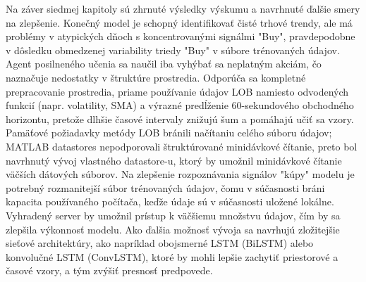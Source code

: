 \documentclass[a4paper,oneside,onecolumn,12pt]{book}
\begin{document}
Na záver siedmej kapitoly sú zhrnuté výsledky výskumu a navrhnuté ďalšie smery na zlepšenie. Konečný model je schopný identifikovať čisté trhové trendy, ale má problémy v atypických dňoch s koncentrovanými signálmi "Buy", pravdepodobne v dôsledku obmedzenej variability triedy "Buy" v súbore trénovaných údajov. Agent posilneného učenia sa naučil iba vyhýbať sa neplatným akciám, čo naznačuje nedostatky v štruktúre prostredia. Odporúča sa kompletné prepracovanie prostredia, priame používanie údajov LOB namiesto odvodených funkcií (napr. volatility, SMA) a výrazné predĺženie 60-sekundového obchodného horizontu, pretože dlhšie časové intervaly znižujú šum a pomáhajú učiť sa vzory. Pamäťové požiadavky metódy LOB bránili načítaniu celého súboru údajov; MATLAB datastores nepodporovali štruktúrované minidávkové čítanie, preto bol navrhnutý vývoj vlastného datastore-u, ktorý by umožnil minidávkové čítanie väčších dátových súborov. Na zlepšenie rozpoznávania signálov "kúpy" modelu je potrebný rozmanitejší súbor trénovaných údajov, čomu v súčasnosti bráni kapacita používaného počítača, keďže údaje sú v súčasnosti uložené lokálne. Vyhradený server by umožnil prístup k väčšiemu množstvu údajov, čím by sa zlepšila výkonnosť modelu. Ako ďalšia možnosť vývoja sa navrhujú zložitejšie sieťové architektúry, ako napríklad obojsmerné LSTM (BiLSTM) alebo konvolučné LSTM (ConvLSTM), ktoré by mohli lepšie zachytiť priestorové a časové vzory, a tým zvýšiť presnosť predpovede.

\begingroup
\renewcommand{\cleardoublepage}{}
\renewcommand{\clearpage}{}
\renewcommand{\pagebreak}{}
\printbibliography[title=References]
\end{document}
